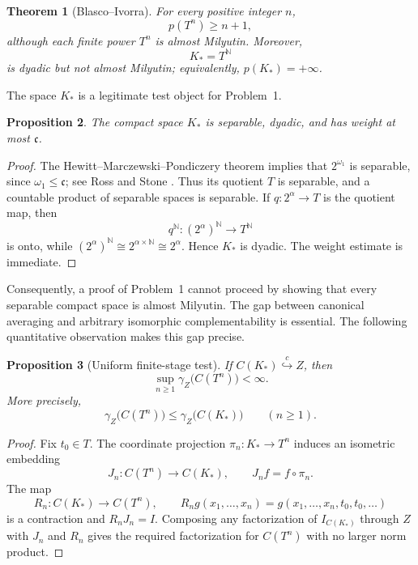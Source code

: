 \documentclass[11pt]{article}
\newtheorem{theorem}{Theorem}[section]
\newtheorem{proposition}[theorem]{Proposition}
\theoremstyle{definition}
\theoremstyle{remark}
\newcommand{\C}{C}
\newcommand{\cc}{\mathfrak c}
\newcommand{\Id}{I}
\newcommand{\hookc}{\stackrel{c}{\hookrightarrow}}
\begin{document}
\begin{theorem}[Blasco--Ivorra]\label{thm:BI}
For every positive integer $n$,
\[
       p(T^n)\geq n+1,
\]
although each finite power $T^n$ is almost Milyutin.  Moreover,
\[
       K_*=T^{\mathbb N}
\]
is dyadic but not almost Milyutin; equivalently, $p(K_*)=+\infty$.
\end{theorem}

The space $K_*$ is a legitimate test object for Problem~1.

\begin{proposition}\label{prop:Kstar-separable}
The compact space $K_*$ is separable, dyadic, and has weight at most
$\cc$.
\end{proposition}

\begin{proof}
The Hewitt--Marczewski--Pondiczery theorem implies that $2^{\omega_1}$ is
separable, since $\omega_1\leq\cc$; see Ross and Stone \cite{RossStone64}.
Thus its quotient $T$ is separable, and a countable product of separable
spaces is separable.  If $q:2^\alpha\to T$ is the quotient map, then
\[
       q^{\mathbb N}:(2^\alpha)^{\mathbb N}\longrightarrow T^{\mathbb N}
\]
is onto, while $(2^\alpha)^{\mathbb N}\cong2^{\alpha\times\mathbb N}
\cong2^\alpha$.  Hence $K_*$ is dyadic.  The weight estimate is immediate.
\end{proof}

Consequently, a proof of Problem~1 cannot proceed by showing that every
separable compact space is almost Milyutin.  The gap between canonical
averaging and arbitrary isomorphic complementability is essential.
The following quantitative observation makes this gap precise.

\begin{proposition}[Uniform finite-stage test]\label{prop:uniform-test}
If $\C(K_*)\hookc Z$, then
\[
       \sup_{n\geq1}\gamma_Z\bigl(\C(T^n)\bigr)<\infty.
\]
More precisely,
\[
       \gamma_Z\bigl(\C(T^n)\bigr)
       \leq \gamma_Z\bigl(\C(K_*)\bigr)
       \qquad(n\geq1).
\]
\end{proposition}

\begin{proof}
Fix $t_0\in T$.  The coordinate projection
$\pi_n:K_*\to T^n$ induces an isometric embedding
\[
 J_n:\C(T^n)\to\C(K_*),\qquad J_nf=f\circ\pi_n.
\]
The map
\[
 R_n:\C(K_*)\to\C(T^n),\qquad
 R_ng(x_1,\dots,x_n)=g(x_1,\dots,x_n,t_0,t_0,\dots)
\]
is a contraction and $R_nJ_n=\Id$.  Composing any factorization of
$\Id_{\C(K_*)}$ through $Z$ with $J_n$ and $R_n$ gives the required
factorization for $\C(T^n)$ with no larger norm product.
\end{proof}
\end{document}
